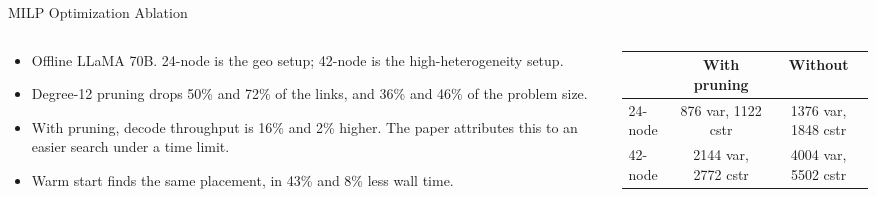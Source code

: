 \begin{frame}[t,label=mm_hx_milpabl_01]{MILP Optimization Ablation}

  \par
  \vspace{.02cm}
  \begin{columns}[c,onlytextwidth]
    \begin{column}{.46\textwidth}
      {\footnotesize\begin{itemize}\setlength{\itemsep}{.09cm}
        \item Offline LLaMA 70B. 24-node is the geo setup; 42-node is the high-heterogeneity setup.
        \item Degree-12 pruning drops 50\% and 72\% of the links, and 36\% and 46\% of the problem size.
        \item With pruning, decode throughput is 16\% and 2\% higher. The paper attributes this to an easier search under a time limit.
        \item Warm start finds the same placement, in 43\% and 8\% less wall time.
      \end{itemize}}
    \end{column}
    \begin{column}{.52\textwidth}
      {\centering\scriptsize
      \begin{tabular}{lcc}\toprule
        & With pruning & Without\\\midrule
        24-node & 876 var, 1122 cstr & 1376 var, 1848 cstr\\
        42-node & 2144 var, 2772 cstr & 4004 var, 5502 cstr\\\bottomrule
      \end{tabular}\par}
    \end{column}
  \end{columns}
  \vspace{.10cm}
\end{frame}

